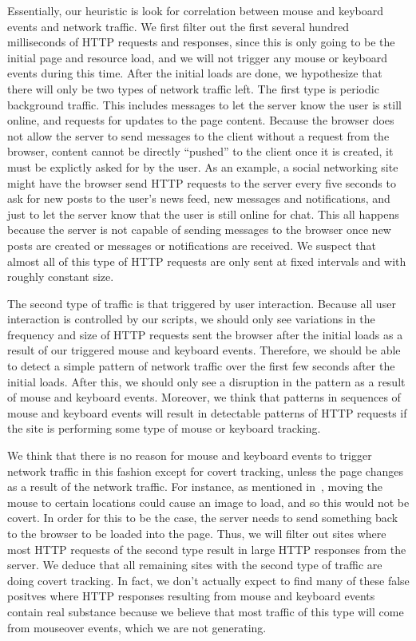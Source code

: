 \documentclass[letterpaper,twocolumn,10pt]{article}
\begin{document}
Essentially, our heuristic is look for correlation between mouse and keyboard events and network traffic. We first filter out the first several hundred milliseconds of HTTP requests and responses, since this is only going to be the initial page and resource load, and we will not trigger any mouse or keyboard events during this time. After the initial loads are done, we hypothesize that there will only be two types of network traffic left. The first type is periodic background traffic. This includes messages to let the server know the user is still online, and requests for updates to the page content. Because the browser does not allow the server to send messages to the client without a request from the browser, content cannot be directly ``pushed'' to the client once it is created, it must be explictly asked for by the user. As an example, a social networking site might have the browser send HTTP requests to the server every five seconds to ask for new posts to the user's news feed, new messages and notifications, and just to let the server know that the user is still online for chat. This all happens because the server is not capable of sending messages to the browser once new posts are created or messages or notifications are received. We suspect that almost all of this type of HTTP requests are only sent at fixed intervals and with roughly constant size.

The second type of traffic is that triggered by user interaction. Because all user interaction is controlled by our scripts, we should only see variations in the frequency and size of HTTP requests sent the browser after the initial loads as a result of our triggered mouse and keyboard events. Therefore, we should be able to detect a simple pattern of network traffic over the first few seconds after the initial loads. After this, we should only see a disruption in the pattern as a result of mouse and keyboard events. Moreover, we think that patterns in sequences of mouse and keyboard events will result in detectable patterns of HTTP requests if the site is performing some type of mouse or keyboard tracking.

We think that there is no reason for mouse and keyboard events to trigger network traffic in this fashion except for covert tracking, unless the page changes as a result of the network traffic. For instance, as mentioned in~\cite{tainttracking}, moving the mouse to certain locations could cause an image to load, and so this would not be covert. In order for this to be the case, the server needs to send something back to the browser to be loaded into the page. Thus, we will filter out sites where most HTTP requests of the second type result in large HTTP responses from the server. We deduce that all remaining sites with the second type of traffic are doing covert tracking. In fact, we don't actually expect to find many of these false positves where HTTP responses resulting from mouse and keyboard events contain real substance because we believe that most traffic of this type will come from mouseover events, which we are not generating.
\end{document}
